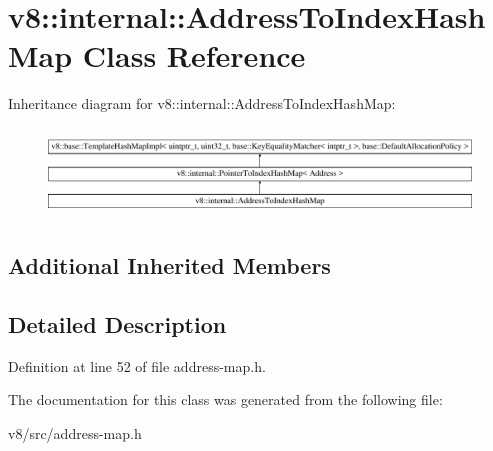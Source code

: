 \hypertarget{classv8_1_1internal_1_1AddressToIndexHashMap}{}\section{v8\+:\+:internal\+:\+:Address\+To\+Index\+Hash\+Map Class Reference}
\label{classv8_1_1internal_1_1AddressToIndexHashMap}
Inheritance diagram for v8\+:\+:internal\+:\+:Address\+To\+Index\+Hash\+Map\+:\begin{figure}[H]
\begin{center}
\leavevmode
\includegraphics[height=2.362869cm]{classv8_1_1internal_1_1AddressToIndexHashMap}
\end{center}
\end{figure}
\subsection*{Additional Inherited Members}


\subsection{Detailed Description}


Definition at line 52 of file address-\/map.\+h.



The documentation for this class was generated from the following file\+:\begin{DoxyCompactItemize}
\item 
v8/src/address-\/map.\+h\end{DoxyCompactItemize}
